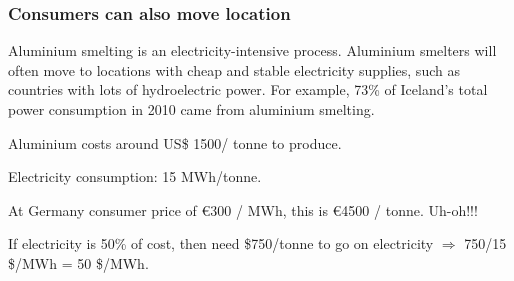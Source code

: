\documentclass[10pt,aspectratio=169,dvipsnames]{beamer}
\begin{document}
\begin{frame}
  \frametitle{Consumers can also move location}

  Aluminium smelting is an electricity-intensive process. Aluminium
  smelters will often move to locations with cheap and stable
  electricity supplies, such as countries with lots of hydroelectric
  power.  For example, 73\% of Iceland's total power consumption in
  2010 came from aluminium smelting.

  Aluminium costs around US\$ 1500/ tonne to produce. %

  Electricity consumption: 15 MWh/tonne.

  At Germany consumer price of \euro 300 / MWh, this is \euro 4500 / tonne. Uh-oh!!!

  If electricity is 50\% of cost, then need \$750/tonne to go on electricity $\Rightarrow$ 750/15 \$/MWh = 50 \$/MWh.













  \end{frame}
\end{document}
